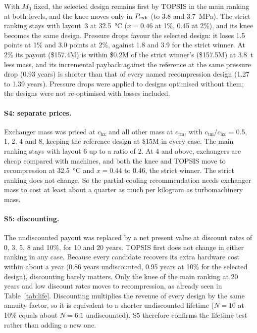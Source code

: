 With $M_0$ fixed, the selected design remains first by TOPSIS in the main ranking at both levels, and the knee moves only in $P_\mathrm{exh}$ (to 3.8 and \SI{3.7}{MPa}). The strict ranking stays with layout~3 at \SI{32.5}{\celsius} ($x = 0.46$ at 1\%, 0.45 at 2\%), and its knee becomes the same design. Pressure drops favour the selected design: it loses 1.5 points at 1\% and 3.0 points at 2\%, against 1.8 and 3.9 for the strict winner. At 2\% its payout (\$157.4M) is within \$0.2M of the strict winner's (\$157.5M) at \SI{3.8}{t} less mass, and its incremental payback against the reference at the same pressure drop (0.93 years) is shorter than that of every named recompression design (1.27 to 1.39 years). Pressure drops were applied to designs optimised without them; the designs were not re-optimised with losses included.

\paragraph{S4: separate prices.} Exchanger mass was priced at $c_\mathrm{hx}$ and all other mass at $c_\mathrm{tm}$, with $c_\mathrm{tm}/c_\mathrm{hx}$ = 0.5, 1, 2, 4 and 8, keeping the reference design at \$15M in every case. The main ranking stays with layout 6 up to a ratio of 2. At 4 and above, exchangers are cheap compared with machines, and both the knee and TOPSIS move to recompression at \SI{32.5}{\celsius} and $x = 0.44$ to 0.46, the strict winner. The strict ranking does not change. So the partial-cooling recommendation needs exchanger mass to cost at least about a quarter as much per kilogram as turbomachinery mass.

\paragraph{S5: discounting.} The undiscounted payout was replaced by a net present value at discount rates of 0, 3, 5, 8 and 10\%, for 10 and 20 years. TOPSIS first does not change in either ranking in any case. Because every candidate recovers its extra hardware cost within about a year (0.86 years undiscounted, 0.95 years at 10\% for the selected design), discounting barely matters. Only the knee of the main ranking at 20 years and low discount rates moves to recompression, as already seen in Table~\ref{tab:life}. Discounting multiplies the revenue of every design by the same annuity factor, so it is equivalent to a shorter undiscounted lifetime ($N = 10$ at 10\% equals about $N = 6.1$ undiscounted). S5 therefore confirms the lifetime test rather than adding a new one.

